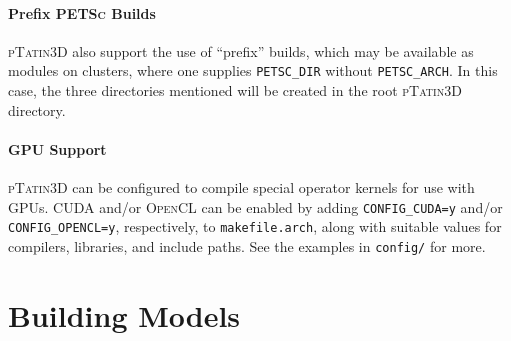 \documentclass[paper=a4, fontsize=11pt,twoside]{scrartcl}
\newcommand{\ptat}{{{\textsc{pTatin3D}}}}
\newcommand{\PETSc}{{{\textsc{PETSc}}}}
\newcommand{\CUDA}{{{\textsc{CUDA}}}}
\newcommand{\OpenCL}{{{\textsc{OpenCL}}}}
\newcommand{\unix}[1]{\texttt{\footnotesize #1}}
\begin{document}
\paragraph{Prefix \PETSc{} Builds}
\ptat{} also support the use of ``prefix'' builds, which may be available as modules on clusters, where one supplies \unix{PETSC\_DIR} without \unix{PETSC\_ARCH}. In this case, the three directories mentioned will be created in the root \ptat{} directory.

\paragraph{GPU Support}
\ptat{} can be configured to compile special operator kernels for use with GPUs. \CUDA{} and/or \OpenCL{} can be enabled by adding \lstinline{CONFIG_CUDA=y} and/or \lstinline{CONFIG_OPENCL=y}, respectively, to \texttt{makefile.arch}, along with suitable values for compilers, libraries, and include paths.
See the examples in \texttt{config/} for more.

\newpage
\section{Building Models}
\end{document}
